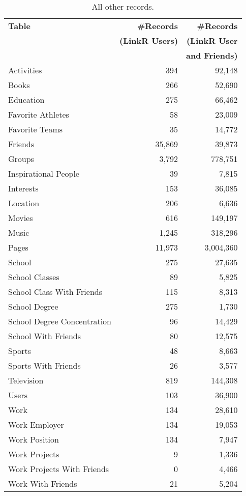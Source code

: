 \documentclass[letterpaper]{article}
\begin{document}
\begin{table}
\centering
\caption{\small All other records.}
\label{tab:all}
\begin{tabular}{|>{\small}p{2cm}|>{\small}r|>{\small}r|}
\hline
\textbf{Table} & \textbf{\#Records} & \textbf{\#Records} \\
& \textbf{(LinkR Users)} & \textbf{(LinkR User} \\
& & \textbf{and Friends)} \\
\hline
Activities & 394 & 92,148 \\
\hline
Books & 266 & 52,690 \\
\hline
Education & 275 & 66,462 \\
\hline
Favorite Athletes & 58 & 23,009 \\
\hline
Favorite Teams & 35 & 14,772 \\
\hline
Friends & 35,869 & 39,873 \\
\hline
Groups & 3,792 & 778,751 \\
\hline
Inspirational People & 39 & 7,815 \\
\hline
Interests & 153 & 36,085 \\
\hline
Location & 206 & 6,636 \\
\hline
Movies & 616 & 149,197 \\
\hline
Music & 1,245 & 318,296 \\
\hline
Pages & 11,973 & 3,004,360 \\
\hline
School & 275 & 27,635 \\
\hline
School Classes & 89 & 5,825 \\
\hline
School Class With Friends & 115 & 8,313 \\
\hline
School Degree & 275 & 1,730 \\
\hline
School Degree Concentration & 96 & 14,429 \\
\hline
School With Friends & 80 & 12,575 \\
\hline
Sports & 48 & 8,663 \\
\hline
Sports With Friends & 26 & 3,577 \\
\hline
Television & 819 & 144,308 \\
\hline
Users & 103 & 36,900 \\
\hline
Work & 134 & 28,610 \\
\hline
Work Employer & 134 & 19,053 \\
\hline
Work Position & 134 & 7,947 \\
\hline
Work Projects & 9 & 1,336 \\
\hline
Work Projects With Friends & 0 & 4,466 \\
\hline
Work With Friends & 21 & 5,204 \\
\hline
\end{tabular}
\end{table}
\end{document}
